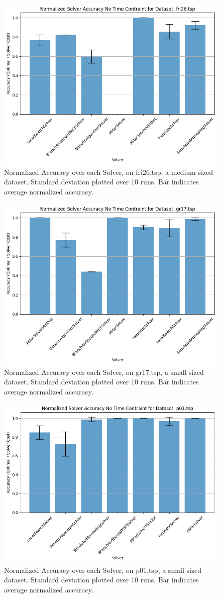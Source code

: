 \documentclass[11pt]{article}
\begin{document}
	\begin{figure}[H]
		\centering
		\includegraphics[width=0.7\linewidth]{figures/accuracy_bar_time0_fri26.tsp}
		\caption{Normalized Accuracy over each Solver, on fri26.tsp, a medium sized dataset. Standard deviation plotted over 10 runs. Bar indicates average normalized accuracy.}
		\label{fig:accuracybartime0fri26}
	\end{figure}
	\begin{figure}[H]
		\centering
		\includegraphics[width=0.7\linewidth]{figures/accuracy_bar_time0_gr17.tsp}
		\caption{Normalized Accuracy over each Solver, on gr17.tsp, a small sized dataset. Standard deviation plotted over 10 runs. Bar indicates average normalized accuracy.}
		\label{fig:accuracybartime0gr17}
	\end{figure}
	\begin{figure}[H]
		\centering
		\includegraphics[width=0.7\linewidth]{figures/accuracy_bar_time0_p01.tsp}
		\caption{Normalized Accuracy over each Solver, on p01.tsp, a small sized dataset. Standard deviation plotted over 10 runs. Bar indicates average normalized accuracy.}
		\label{fig:accuracybartime0p01}
	\end{figure}
	
\end{document}
